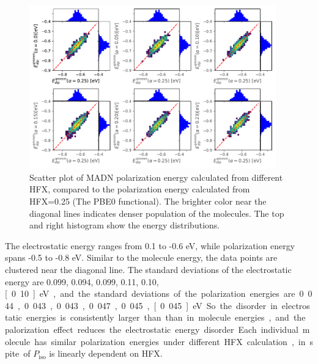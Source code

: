 \documentclass[letterpaper,12pt]{article}
\begin{document}
\begin{figure}[H]
    \centering
    \includegraphics[width=0.95\textwidth]{figs/MADN_HFX/scatterEdip_qmmm.pdf}
    \caption{Scatter plot of MADN polarization energy calculated from different HFX, compared to the polarization energy calculated from HFX=0.25 (The PBE0 functional). The brighter color near the diagonal lines indicates denser population of the molecules.  The top and right histogram show the energy distributions.}
    \label{fig:Edip_qmmm_MADN}
\end{figure}

The electrostatic energy ranges from 0.1 to -0.6 eV, while polarization energy spans -0.5 to -0.8 eV.  Similar to the molecule energy, the data points are clustered near the diagonal line. 
The standard deviations of the electrostatic energy are 0.099, 0.094, 0.099, 0.11, 0.10, \unit[0.10]{eV}, and the standard deviations of the polarization energies are 0.044, 0.043, 0.043, 0.047, 0.045, \unit[0.045]{eV}. So the disorder in electrostatic energies is consistently larger than than in molecule energies, and the palorization effect reduces the electrostatic energy disorder. 
Each individual molecule has similar polarization energies under different HFX calculation, in spite of $P_\text{iso}$ is linearly dependent on HFX. 
\end{document}
